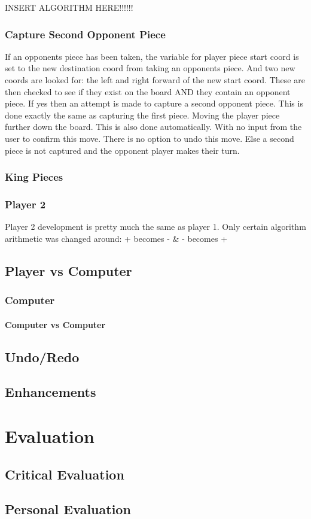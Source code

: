 \documentclass[10pt, a4paper]{article}
\begin{document}
    INSERT ALGORITHM HERE!!!!!!
    
    \subsubsection{Capture Second Opponent Piece}
    If an opponents piece has been taken, the variable for player piece start coord is set to the new destination coord from taking an opponents piece. And two new coords are looked for: the left and right forward of the new start coord. These are then checked to see if they exist on the board AND they contain an opponent piece. If yes then an attempt is made to capture a second opponent piece. This is done exactly the same as capturing the first piece. Moving the player piece further down the board. This is also done automatically. With no input from the user to confirm this move. There is no option to undo this move.
    Else a second piece is not captured and the opponent player makes their turn.
    \subsubsection{King Pieces}
    \subsubsection{Player 2}
    Player 2 development is pretty much the same as player 1. Only certain algorithm arithmetic was changed around: + becomes - \& - becomes +
    \subsection{Player vs Computer}    
    \subsubsection{Computer}
    \paragraph{Computer vs Computer}
    \subsection{Undo/Redo}
    \subsection{Enhancements}
\section{Evaluation}
	\subsection{Critical Evaluation}
	\subsection{Personal Evaluation}	


		
\end{document}
